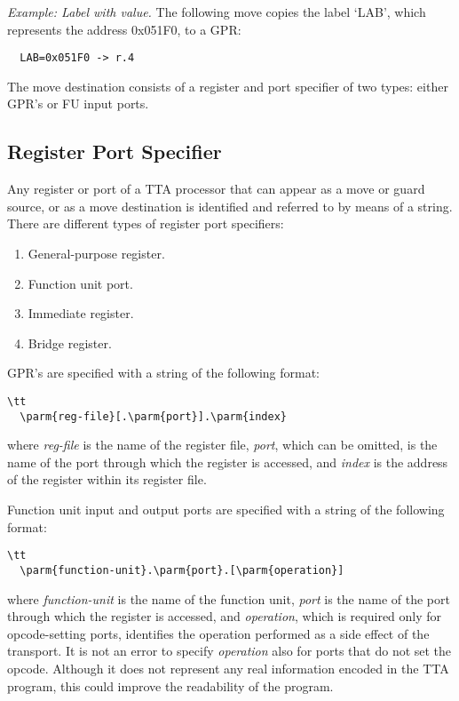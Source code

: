 \documentclass[twoside]{tceusermanual}
\begin{document}
\emph{Example: Label with value.}
%
The following move copies the label `LAB', which represents the address
0x051F0, to a GPR:
\begin{verbatim}
  LAB=0x051F0 -> r.4
\end{verbatim}

The move destination consists of a register and port specifier of two types:
either GPR's or FU input ports.

\subsection{Register Port Specifier}
\label{ssec:move-terminal}

Any register or port of a TTA processor that can appear as a move or guard
source, or as a move destination is identified and referred to by means of a
string.
%
There are different types of register port specifiers:
\begin{enumerate}
\item %
  General-purpose register.
\item %
  Function unit port.
\item %
  Immediate register.
\item %
  Bridge register.
\end{enumerate}

GPR's are specified with a string of the following format:

\begin{verbatim}\tt
  \parm{reg-file}[.\parm{port}].\parm{index}
\end{verbatim}

where \emph{reg-file} is the name of the register file,
%
%
\emph{port}, which can be omitted, is the name of the port through which the
register is accessed, and \emph{index} is the address of the register within
its register file.

Function unit input and output ports are specified with a string of the
following format:

\begin{verbatim}\tt
  \parm{function-unit}.\parm{port}.[\parm{operation}]
\end{verbatim}

where \emph{function-unit} is the name of the function unit, \emph{port} is
the name of the port through which the register is accessed, and
\emph{operation}, which is required only for opcode-setting ports,
identifies the operation performed as a side effect of the transport.
%
It is not an error to specify \emph{operation} also for ports that do not
set the opcode.  Although it does not represent any real information encoded
in the TTA program, this could improve the readability of the program.
\end{document}
